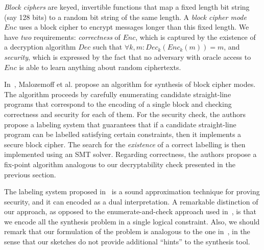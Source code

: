 \documentclass[preprint]{sig-alternate-05-2015}
\begin{document}
{\em{Block ciphers}} are keyed, invertible
functions that map a fixed length bit string (say 128 bits) to a random bit string
of the same length. A {\em{block cipher mode}} $Enc$ uses a block cipher to encrypt
messages longer than this fixed length. We have {\em{two}} requirements:
{\em{correctness}} of $Enc$, which is captured by the
existence of a decryption algorithm $Dec$ such that $\forall k, m : Dec_k(
Enc_k( m ) ) = m$, and {\em{security}}, which is expressed by the fact that no adversary with
oracle access to $Enc$ is able to learn anything about random ciphertexts.

In~\cite{DBLP:conf/csfw/MalozemoffKG14}, Malozemoff et al. propose
an algorithm for synthesis of block cipher modes.
The algorithm proceeds by carefully enumerating candidate straight-line programs
that correspond to the encoding of a single block and checking
correctness and security for each of them.
For the security check, the authors propose a 
labeling system that guarantees that if a candidate straight-line program
can be labelled satisfying certain constraints, 
then it implements a secure block cipher.
The search for the {\em existence} of a correct labelling
is then implemented using an SMT solver.
Regarding correctness, the authors propose a
fix-point algorithm analogous to our decryptability check presented in the previous
section.

The labeling system proposed in~\cite{DBLP:conf/csfw/MalozemoffKG14} is
a sound approximation technique for proving security,
and it can encoded as a dual interpretation.
A remarkable distinction of our approach, as opposed to the
enumerate-and-check approach used in~\cite{DBLP:conf/csfw/MalozemoffKG14},
is that we encode all the synthesis problem in a single logical constraint.
Also, we should remark that our formulation of the problem 
is analogous to the one in~\cite{DBLP:conf/csfw/MalozemoffKG14},
in the sense that our sketches do not provide 
additional ``hints'' to the synthesis tool.

\end{document}
